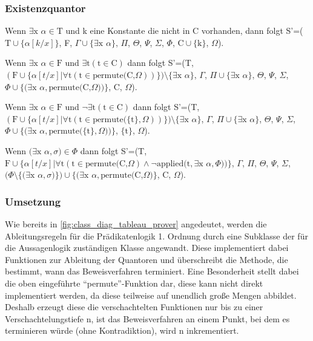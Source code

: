 \subsubsection{Existenzquantor}
Wenn $\exists\textrm{x}$ $\alpha\in\textrm{T}$ und k eine Konstante die nicht in C vorhanden, dann folgt S'=($\textrm{T}\cup\lbrace\alpha[k/x]\rbrace$, F, $\Gamma\cup\lbrace\exists\textrm{x}$ $\alpha\rbrace$, $\Pi$, $\Theta$, $\Psi$, $\Sigma$, $\Phi$, $\textrm{C}\cup\lbrace\textrm{k}\rbrace$, $\Omega$).

Wenn $\exists\textrm{x}$ $\alpha\in\textrm{F}$ und $\exists\textrm{t}(\textrm{t}\in\textrm{C})$ dann folgt S'=(T, $(\textrm{F}\cup\lbrace\alpha[t/x]|\forall\textrm{t}(\textrm{t}\in\textrm{permute(C,}\Omega))\rbrace)\setminus\lbrace\exists\textrm{x}$ $\alpha\rbrace$, $\Gamma$, $\Pi\cup\lbrace\exists\textrm{x}$ $\alpha\rbrace$, $\Theta$, $\Psi$, $\Sigma$, $\Phi\cup\lbrace(\exists\textrm{x}$ $\alpha,\textrm{permute(C,}\Omega))\rbrace$, C, $\Omega$).

Wenn $\exists\textrm{x}$ $\alpha\in\textrm{F}$ und $\neg\exists\textrm{t}(\textrm{t}\in\textrm{C})$ dann folgt S'=(T, $(\textrm{F}\cup\lbrace\alpha[t/x]|\forall\textrm{t}(\textrm{t}\in\textrm{permute(}\lbrace\textrm{t}\rbrace,\Omega))\rbrace)\setminus\lbrace\exists\textrm{x}$ $\alpha\rbrace$, $\Gamma$, $\Pi\cup\lbrace\exists\textrm{x}$ $\alpha\rbrace$, $\Theta$, $\Psi$, $\Sigma$, $\Phi\cup\lbrace(\exists\textrm{x}$ $\alpha,\textrm{permute(}\lbrace\textrm{t}\rbrace,\Omega))\rbrace$, $\lbrace\textrm{t}\rbrace$, $\Omega$).

Wenn $(\exists\textrm{x}$ $\alpha, \sigma)\in\Phi$ dann folgt S'=(T, $\textrm{F}\cup\lbrace\alpha[t/x]|\forall\textrm{t}(\textrm{t}\in\textrm{permute(C,}\Omega)\wedge\neg\textrm{applied(t},\exists\textrm{x}$ $\alpha, \Phi))\rbrace$, $\Gamma$, $\Pi$, $\Theta$, $\Psi$, $\Sigma$, $(\Phi\setminus\lbrace(\exists\textrm{x}$ $\alpha, \sigma)\rbrace)\cup\lbrace(\exists\textrm{x}$ $\alpha,\textrm{permute(C,}\Omega)\rbrace$, C, $\Omega$).

\subsubsection{\label{sec:umsetzung_pred_logic}Umsetzung}
Wie bereits in \autoref{fig:class_diag_tableau_prover} angedeutet, werden die Ableitungsregeln für die Prädikatenlogik 1. Ordnung durch eine Subklasse der für die Aussagenlogik zuständigen Klasse angewandt. Diese implementiert dabei Funktionen zur Ableitung der Quantoren und überschreibt die Methode, die bestimmt, wann das Beweisverfahren terminiert. Eine Besonderheit stellt dabei die oben eingeführte ``permute''-Funktion dar, diese kann nicht direkt implementiert werden, da diese teilweise auf unendlich große Mengen abbildet. Deshalb erzeugt diese die verschachtelten Funktionen nur bis zu einer Verschachtelungstiefe n, ist das Beweisverfahren an einem Punkt, bei dem es terminieren würde (ohne Kontradiktion), wird n inkrementiert.

